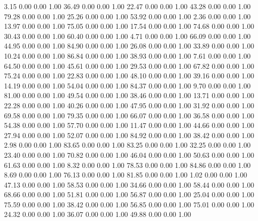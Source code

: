     3.15   0.00   0.00   1.00
   36.49   0.00   0.00   1.00
   22.47   0.00   0.00   1.00
   43.28   0.00   0.00   1.00
   79.28   0.00   0.00   1.00
   25.26   0.00   0.00   1.00
   53.92   0.00   0.00   1.00
    2.36   0.00   0.00   1.00
   13.97   0.00   0.00   1.00
   75.05   0.00   0.00   1.00
   17.54   0.00   0.00   1.00
   74.68   0.00   0.00   1.00
   30.43   0.00   0.00   1.00
   60.40   0.00   0.00   1.00
    4.71   0.00   0.00   1.00
   66.09   0.00   0.00   1.00
   44.95   0.00   0.00   1.00
   84.90   0.00   0.00   1.00
   26.08   0.00   0.00   1.00
   33.89   0.00   0.00   1.00
   10.24   0.00   0.00   1.00
   86.84   0.00   0.00   1.00
   38.93   0.00   0.00   1.00
    7.61   0.00   0.00   1.00
   64.50   0.00   0.00   1.00
   45.61   0.00   0.00   1.00
   29.53   0.00   0.00   1.00
   67.82   0.00   0.00   1.00
   75.24   0.00   0.00   1.00
   22.83   0.00   0.00   1.00
   48.10   0.00   0.00   1.00
   39.16   0.00   0.00   1.00
   14.19   0.00   0.00   1.00
   54.04   0.00   0.00   1.00
   84.37   0.00   0.00   1.00
    9.70   0.00   0.00   1.00
   81.00   0.00   0.00   1.00
   49.54   0.00   0.00   1.00
   38.46   0.00   0.00   1.00
   13.71   0.00   0.00   1.00
   22.28   0.00   0.00   1.00
   40.26   0.00   0.00   1.00
   47.95   0.00   0.00   1.00
   31.92   0.00   0.00   1.00
   69.58   0.00   0.00   1.00
   79.35   0.00   0.00   1.00
   66.07   0.00   0.00   1.00
   36.58   0.00   0.00   1.00
   54.38   0.00   0.00   1.00
   57.70   0.00   0.00   1.00
   11.47   0.00   0.00   1.00
   44.66   0.00   0.00   1.00
   27.94   0.00   0.00   1.00
   52.07   0.00   0.00   1.00
   84.92   0.00   0.00   1.00
   38.42   0.00   0.00   1.00
    2.98   0.00   0.00   1.00
   83.65   0.00   0.00   1.00
   83.25   0.00   0.00   1.00
   32.25   0.00   0.00   1.00
   23.40   0.00   0.00   1.00
   70.82   0.00   0.00   1.00
   46.04   0.00   0.00   1.00
   50.63   0.00   0.00   1.00
   61.63   0.00   0.00   1.00
    8.32   0.00   0.00   1.00
   78.53   0.00   0.00   1.00
   84.86   0.00   0.00   1.00
    8.69   0.00   0.00   1.00
   76.13   0.00   0.00   1.00
   81.85   0.00   0.00   1.00
    1.02   0.00   0.00   1.00
   47.13   0.00   0.00   1.00
   58.53   0.00   0.00   1.00
   34.66   0.00   0.00   1.00
   58.44   0.00   0.00   1.00
   68.66   0.00   0.00   1.00
   51.81   0.00   0.00   1.00
   56.87   0.00   0.00   1.00
   25.04   0.00   0.00   1.00
   75.59   0.00   0.00   1.00
   38.42   0.00   0.00   1.00
   56.85   0.00   0.00   1.00
   75.01   0.00   0.00   1.00
   24.32   0.00   0.00   1.00
   36.07   0.00   0.00   1.00
   49.88   0.00   0.00   1.00
